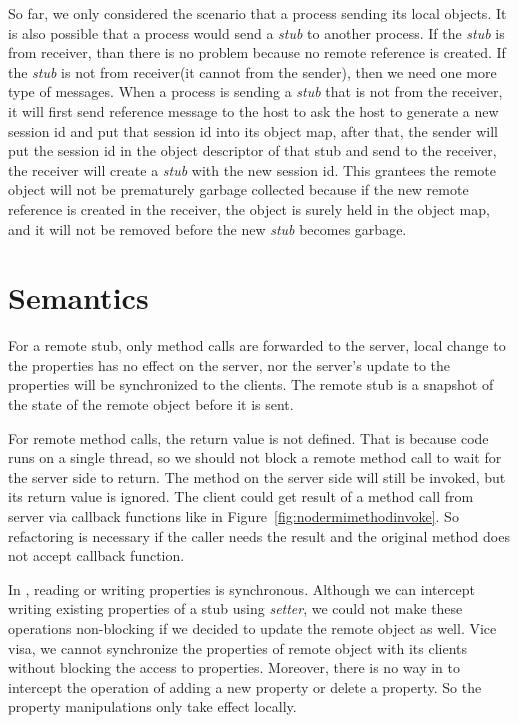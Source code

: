 So far, we only considered the scenario that a process sending its local
objects.
It is also possible that a process would send a \emph{stub} to another process.
If the \emph{stub} is from receiver, than there is no problem because no remote
reference is created.
If the \emph{stub} is not from receiver(it cannot from the sender),
then we need one more type of messages.
When a process is sending a \emph{stub} that is not from the receiver,
it will first send reference message to the host to ask the host
to generate a new session id and put that session id into its object map,
after that, the sender will put the session id in the object descriptor of that 
stub and send to the receiver,
the receiver will create a \emph{stub} with the new session id.
This grantees the remote object will not be prematurely garbage collected 
because if the new remote reference is created in the receiver,
the object is surely held in the object map,
and it will not be removed before the new \emph{stub} becomes garbage.


\section{Semantics}
For a remote stub, only method calls are forwarded to the server,
local change to the properties has no effect on the server,
nor the server's update to the properties will be synchronized to the clients.
The remote stub is a snapshot of the state of the remote object before it is sent.

For remote method calls, the return value is not defined. 
That is because \js{} code runs on a single thread, so we should not block
a remote method call to wait for the server side to return.
The method on the server side will still be invoked, 
but its return value is ignored.
The client could get result of a method call 
from server via callback functions like in Figure~\ref{fig:nodermimethodinvoke}.
So refactoring is necessary if the caller needs the result and 
the original method does not accept callback function.

In \js{}, reading or writing properties is synchronous. 
Although we can intercept writing existing properties of a stub using
\emph{setter}, we could not make these operations non-blocking if we decided to update
the remote object as well.
Vice visa, we cannot synchronize the properties of remote object with its clients without
blocking the access to properties.
Moreover, there is no way in \js{} to intercept the operation of adding a new property or delete 
a property.
So the property manipulations only take effect locally.


